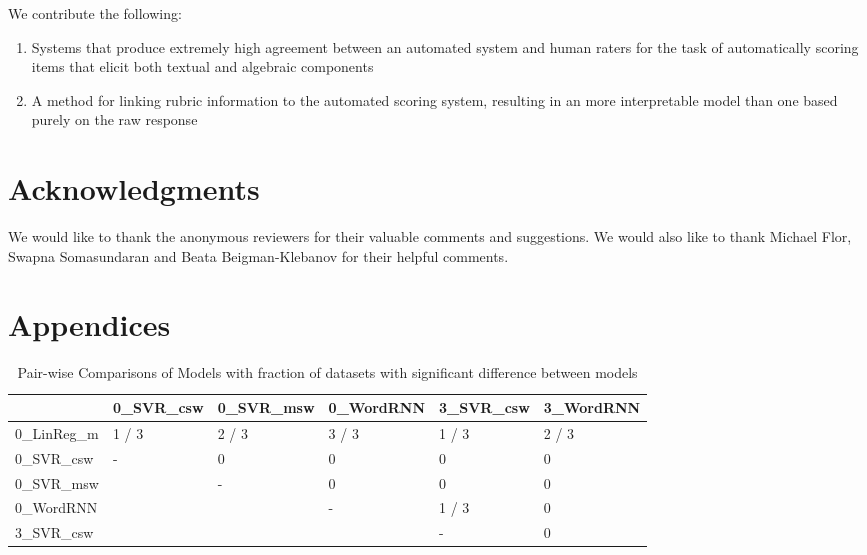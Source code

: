 \documentclass[11pt,a4paper]{article}
\begin{document}
We contribute the following:
\begin{enumerate}
    \item Systems that produce extremely high agreement between an automated system and human raters for the task of automatically scoring items that elicit both textual and algebraic components
    \item A method for linking rubric information to the automated scoring system, resulting in an more interpretable model than one based purely on the raw response
\end{enumerate}

\section*{Acknowledgments}
We would like to thank the anonymous reviewers for their valuable comments and suggestions. We would also like to thank Michael Flor, Swapna Somasundaran and Beata Beigman-Klebanov for their helpful comments.




\appendix
\section{Appendices}
\label{sec:appendix}

\begin{table*}[]
\begin{center}
\begin{tabular}{|l|llll|l|}
\hline
 & \multicolumn{1}{l|}{0\_SVR_{csw}} & \multicolumn{1}{l|}{0\_SVR_{msw}} & \multicolumn{1}{l|}{0\_WordRNN} & 3\_SVR_{csw} & 3\_WordRNN \\ \hline
0\_LinReg_{m} & \multicolumn{1}{l|}{1 / 3} & \multicolumn{1}{l|}{2 / 3} & \multicolumn{1}{l|}{3 / 3} & 1 / 3 & 2 / 3 \\ \hline
0\_SVR_{csw} & \multicolumn{1}{l|}{-} & \multicolumn{1}{l|}{0} & \multicolumn{1}{l|}{0} & 0 & 0 \\ \cline{1-1} \cline{3-6} 
0\_SVR_{msw} &  & \multicolumn{1}{l|}{-} & \multicolumn{1}{l|}{0} & 0 & 0 \\ \cline{1-1} \cline{4-6} 
0\_WordRNN &  &  & \multicolumn{1}{l|}{-} & 1 / 3 & 0 \\ \cline{1-1} \cline{5-6} 
3\_SVR_{csw} &  &  &  & - & 0 \\ \hline
\end{tabular}
\caption{Pair-wise Comparisons of Models with fraction of datasets with significant difference between models}
\label{table:significance}
\end{center}
\end{table*}
\end{document}
